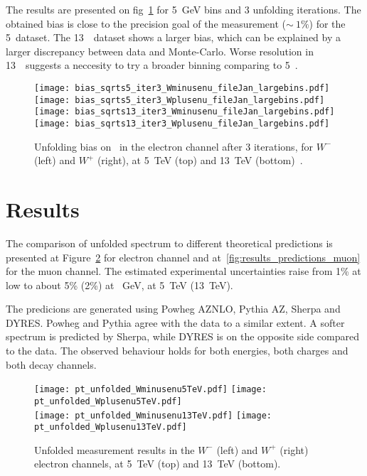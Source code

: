 The results are presented on fig~\ref{fig:BiasResultLargeBins} for 5~GeV bins and 3 unfolding iterations. The obtained bias is close to the precision goal of the measurement ($\sim~1\%$) for the 5~\TeV dataset. The 13~\TeV\ dataset shows a larger bias, which can be explained by a larger discrepancy between data and Monte-Carlo. Worse resolution in 13~\TeV\ suggests a neccesity to try a broader binning comparing to 5~\GeV.

\begin{figure}[h]
	\centering
	{\texttt{[image: bias\_sqrts5\_iter3\_Wminusenu\_fileJan\_largebins.pdf]}}
	{\texttt{[image: bias\_sqrts5\_iter3\_Wplusenu\_fileJan\_largebins.pdf]}}\\
	{\texttt{[image: bias\_sqrts13\_iter3\_Wminusenu\_fileJan\_largebins.pdf]}}
	{\texttt{[image: bias\_sqrts13\_iter3\_Wplusenu\_fileJan\_largebins.pdf]}}
	\caption{Unfolding bias on \ptw\ in the electron channel after 3 iterations, for $W^-$ (left) and $W^+$ (right), at 5~TeV (top) and 13~TeV (bottom)~\cite{int_note_1}.}
	\label{fig:BiasResultLargeBins}
\end{figure}
\clearpage



\section{Results}
The comparison of unfolded spectrum to different theoretical predictions is presented at Figure~\ref{fig:results_predictions_elec} for electron channel and at~\ref{fig:results_predictions_muon} for the muon channel. The estimated experimental uncertainties raise from 1\% at low \ptw to about 5\% (2\%) at ~GeV, at 5~TeV (13~TeV).

The predicions are generated using Powheg AZNLO, Pythia AZ, Sherpa and DYRES. Powheg and Pythia agree with the data to a similar extent. A softer spectrum is predicted by Sherpa, while DYRES is on the opposite side compared to the data. The observed behaviour holds for both energies, both charges and both decay channels.

\begin{figure}[h]
	\centering
	{\texttt{[image: pt\_unfolded\_Wminusenu5TeV.pdf]}}
	{\texttt{[image: pt\_unfolded\_Wplusenu5TeV.pdf]}} \\
	{\texttt{[image: pt\_unfolded\_Wminusenu13TeV.pdf]}}
	{\texttt{[image: pt\_unfolded\_Wplusenu13TeV.pdf]}}
	\caption{Unfolded measurement results in the $W^-$ (left) and $W^+$ (right) electron channels, at 5~TeV (top) and 13~TeV (bottom).}
	\label{fig:results_predictions_elec}
\end{figure}

